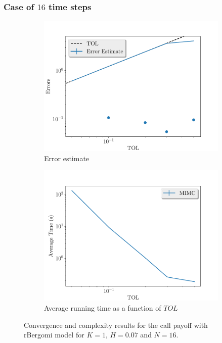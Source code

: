 \documentclass[11pt]{article}
\begin{document}
\subsubsection*{Case of $16$ time steps}
\begin{figure}[!h]
	\centering
	\begin{subfigure}{.4\textwidth}
		\centering
		\includegraphics[width=1\linewidth]{./figures/bergomi_misc/H_007/N_16/error_estimate.pdf}
		\caption{Error estimate}
		\label{fig:misc_rbergomi_8_steps_sub1}
	\end{subfigure}%
	\begin{subfigure}{.4\textwidth}
		\centering
		\includegraphics[width=1\linewidth]{./figures/bergomi_misc/H_007/N_16/average_running_time.pdf}
		\caption{Average running time as a function of $TOL$}
		\label{fig:misc_rbergomi_8_steps_sub2}
	\end{subfigure}%
	\caption{Convergence and complexity results for the call payoff with rBergomi model for $K=1$, $H=0.07$ and $N=16$.}
	\label{fig:misc_rbergomi_8_steps_1}
\end{figure}
\end{document}
